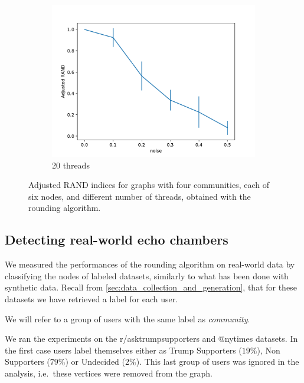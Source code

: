 \begin{figure}
\begin{center}
		\begin{subfigure}[b]{0.3\textwidth}
			\centering
			\includegraphics[width=\textwidth]{tex/out/synthetic_20t/model2_noise_adj_rand.pdf}
			\caption{20 threads}
			\label{fig:tex/out/synthetic_8t/model2_noise_adj_rand.pdf}
		\end{subfigure}
	\end{center}
	\caption{Adjusted RAND indices for graphs with four communities, each of
		six nodes, and different number of threads, obtained with the rounding
		algorithm.}
	\label{fig:clustering-threads}
\end{figure}

\subsection{Detecting real-world echo chambers}%
\label{sub:detecting_real_echo_chambers}

We measured the performances of the rounding algorithm on real-world data by
classifying the nodes of labeled datasets, similarly to what has been done
with synthetic data. Recall from \autoref{sec:data_collection_and_generation},
that for these datasets we have retrieved a label for each user.

We will refer to a group of users with the same label as \emph{community}.

We ran the experiments on the r/asktrumpsupporters and
@nytimes datasets. In the first case users label themselves either as Trump Supporters ($19\%$), Non
Supporters ($79\%$) or Undecided ($2\%$). This last group of users was ignored
in the analysis, i.e.\ these vertices were removed from the graph.

